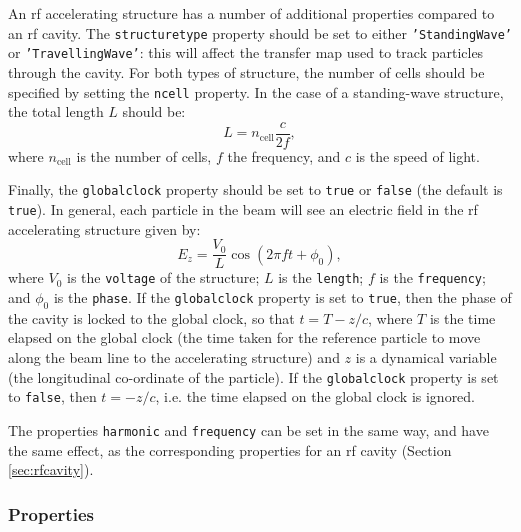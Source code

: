 \documentclass[11pt,twoside,a4paper]{article}
\begin{document}
An rf accelerating structure has a number of additional properties compared to an
rf cavity.  The \texttt{structuretype} property should be set to either
\texttt{'StandingWave'} or \texttt{'TravellingWave'}: this will affect the transfer map
used to track particles through the cavity.  For both types of structure, the number of
cells should be specified by setting the \texttt{ncell} property.  In the case of a
standing-wave structure, the total length $L$ should be:
\[
L = n_\mathrm{cell}\frac{c}{2f},
\]
where $n_\mathrm{cell}$ is the number of cells, $f$ the frequency, and $c$ is the
speed of light.

Finally, the \texttt{globalclock} property should be set to \texttt{true} or \texttt{false}
(the default is \texttt{true}).  In general, each particle in the beam will see an electric
field in the rf accelerating structure given by:
\[
E_z = \frac{V_0}{L} \cos \! \left( 2\pi f t + \phi_0 \right),
\]
where $V_0$ is the \texttt{voltage} of the structure; $L$ is the \texttt{length}; $f$
is the \texttt{frequency}; and $\phi_0$ is the \texttt{phase}.  If the \texttt{globalclock}
property is set to \texttt{true}, then the phase of the cavity is locked to the global clock,
so that $t = T - z/c$, where $T$ is the time elapsed on the global clock (the time taken
for the reference particle to move along the beam line to the accelerating structure)
and $z$ is a dynamical variable (the longitudinal co-ordinate of the particle).
If the \texttt{globalclock} property is set to \texttt{false}, then $t = -z/c$, i.e. the
time elapsed on the global clock is ignored.

The properties \texttt{harmonic} and \texttt{frequency} can be set in the same way,
and have the same effect, as the corresponding properties for an rf cavity
(Section \ref{sec:rfcavity}).

\subsubsection{Properties}
\end{document}
